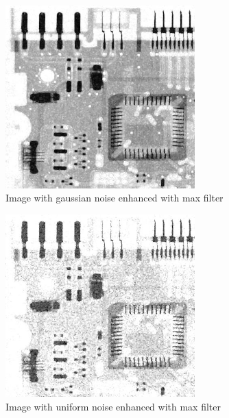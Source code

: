 \documentclass[10pt]{article}
\begin{document}
\begin{figure}[!ht]
	\centering
	\includegraphics[height=200pt]{./ex4/gaussmax.jpg}
	\caption{Image with gaussian noise enhanced with max filter}
\end{figure}
\begin{figure}[!ht]
	\centering
	\includegraphics[height=200pt]{./ex4/unimax.jpg}
	\caption{Image with uniform noise enhanced with max filter}
\end{figure}
\end{document}
